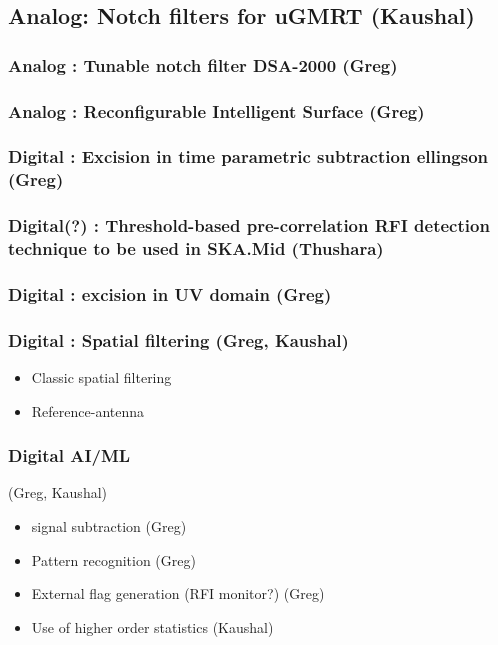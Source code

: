 \subsection{Analog: Notch filters for uGMRT (Kaushal)}
\subsubsection{Analog : Tunable notch filter DSA-2000 (Greg)}
\subsubsection{Analog : Reconfigurable Intelligent Surface (Greg)}
\subsubsection{Digital : Excision in time parametric subtraction ellingson (Greg)}
\subsubsection{Digital(?) : Threshold-based pre-correlation RFI detection technique to be used in SKA.Mid (Thushara)}
\subsubsection{Digital : excision in UV domain (Greg)}
\subsubsection{Digital : Spatial filtering (Greg, Kaushal)}
\begin{itemize}
\item Classic spatial filtering
\item Reference-antenna
\end{itemize}
\subsubsection{Digital AI/ML} (Greg, Kaushal)
\begin{itemize}
\item signal subtraction (Greg)
\item Pattern recognition (Greg)
\item External flag generation (RFI monitor?) (Greg)
\item Use of higher order statistics (Kaushal)
\end{itemize}